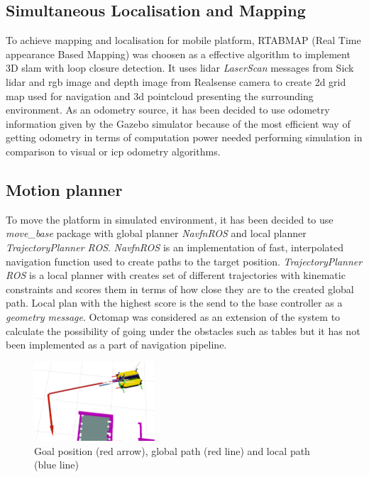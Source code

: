 \documentclass[conference,a4paper]{IEEEtran}
\begin{document}
\subsection{Simultaneous Localisation and Mapping}
To achieve mapping and localisation for mobile platform, RTABMAP (Real Time appearance Based Mapping) \cite{RTABMAP} was choosen as a effective algorithm to implement 3D slam with loop closure detection. It uses lidar \textit{LaserScan} messages from Sick lidar and rgb image and depth image from Realsense camera to create 2d grid map used for navigation and 3d pointcloud presenting the surrounding environment. 
As an odometry source, it has been decided to use odometry information given by the Gazebo simulator because of the most efficient way of getting odometry in terms of computation power needed performing simulation in comparison to visual or icp odometry algorithms.

\subsection{Motion planner}
To move the platform in simulated environment, it has been decided to use \textit{move\_base} package with global planner \textit{NavfnROS} and local planner \textit{TrajectoryPlanner ROS}. \textit{NavfnROS} is an implementation of fast, interpolated navigation function used to create paths to the target position.  \textit{TrajectoryPlanner ROS} is a local planner with creates set of different trajectories with kinematic constraints
and scores them in terms of how close they are to the created global path. Local plan with the highest score is the send to the base controller as a \textit{geometry message}.
Octomap was considered as an extension of the system to calculate the possibility of going under the obstacles such as tables but it has not been implemented as a part of navigation pipeline.

\begin{figure}[ht]
  \centering
  \includegraphics[width=0.4\textwidth]{img/global_local_planner.png}
  \caption[global and local path]{Goal position (red arrow), global path (red line) and local path (blue line)}
\end{figure}
\FloatBarrier
\end{document}

